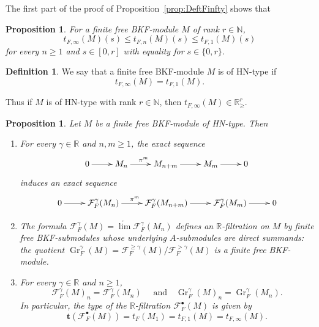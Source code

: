 \documentclass[11pt]{article}
\newtheorem{prop}[theo]{Proposition}
\theoremstyle{definition}
\newtheorem{defi}[theo]{Definition}
\numberwithin{equation}{section}
\numberwithin{figure}{section}
\numberwithin{table}{section}
\DeclareMathOperator{\Gr}{Gr}
\begin{document}
The first part of the proof of Proposition~\ref{prop:DeftFinfty} shows that

\begin{prop}\label{prop:ComptFinftytFn}
For a finite free BKF-module $M$ of rank $r\in\mathbb{N}$,
\[
t_{F,\infty}(M)(s)\leq t_{F,n}(M)(s)\leq t_{F,1}(M)(s)
\]
for every $n\geq1$ and $s\in[0,r]$ with equality for $s\in\{0,r\}$.
\end{prop}

\begin{defi}\label{Def:HNType}
We say that a finite free BKF-module $M$ is of HN-type if
\[
t_{F,\infty}(M)=t_{F,1}(M).
\]
\end{defi}

Thus if $M$ is of HN-type with rank $r\in\mathbb{N}$, then $t_{F,\infty}(M)\in\mathbb{R}_{\geq}^{r}$.

\begin{prop}\label{prop:TypeHN}
Let $M$ be a finite free BKF-module of HN-type. Then
\begin{enumerate}
\item \label{2.10.1} For every $\gamma\in\mathbb{R}$ and $n,m\geq1$, the exact sequence
\[
\xymatrix{0\ar[r] & M_{n}\ar[r]^{\pi^{m}} & M_{n+m}\ar[r] & M_{m}\ar[r] & 0}
\]
induces an exact sequence
\[
\xymatrix{0\ar[r] & \mathcal{F}_{F}^{\gamma}(M_{n})\ar[r]^{\pi^{m}} & \mathcal{F}_{F}^{\gamma}(M_{n+m})\ar[r] & \mathcal{F}_{F}^{\gamma}(M_{m})\ar[r] & 0}
\]
\item \label{2.10.2} The formula $\mathcal{F}_{F}^{\gamma}(M)=\underleftarrow{\lim}\mathcal{F}_{F}^{\gamma}(M_{n})$ defines an $\mathbb{R}$-filtration on $M$ by finite free BKF-submodules whose underlying $A$-submodules are direct summands: the quotient $\Gr_{F}^{\gamma}(M)=\mathcal{F}_{F}^{\geq\gamma}(M)/\mathcal{F}_{F}^{>\gamma}(M)$ is a finite free BKF-module.
\item \label{2.10.3} For every $\gamma\in\mathbb{R}$ and $n\geq1$,
\[
\mathcal{F}_{F}^{\gamma}(M)_{n}=\mathcal{F}_{F}^{\gamma}(M_{n})\quad\text{ and}\quad\Gr_{F}^{\gamma}(M)_{n}=\Gr_{F}^{\gamma}(M_{n}).
\]
In particular, the type of the $\mathbb{R}$-filtration $\mathcal{F}_{F}^{\bullet}(M)$ is given by
\[
\mathbf{t}\left(\mathcal{F}_{F}^{\bullet}(M)\right)=t_{F}(M_{1})=t_{F,1}(M)=t_{F,\infty}(M).
\]
\end{enumerate}
\end{prop}
\end{document}
